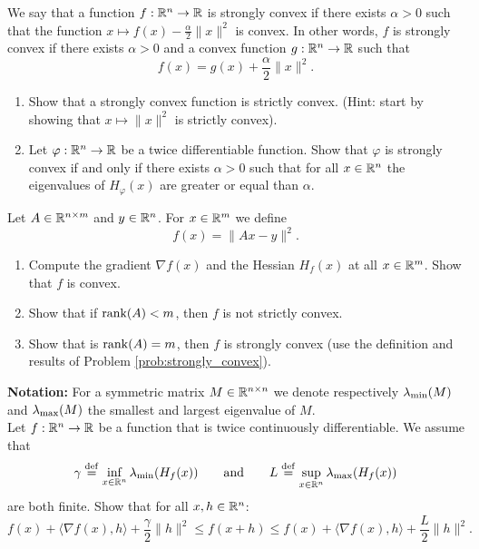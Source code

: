 \documentclass[11pt,nocut]{article}
\begin{document}
\begin{problem}[3 points]\label{prob:strongly_convex}
	We say that a function $f: \mathbb{R}^n \to \mathbb{R}$ is strongly convex if there exists $\alpha >0$ such that the function $x \mapsto f(x) - \frac{\alpha}{2} \|x\|^2$ is convex. In other words, $f$ is strongly convex if there exists $\alpha > 0$ and a convex function $g: \mathbb{R}^n \to \mathbb{R}$ such that 
	$$
	f(x) = g(x) + \frac{\alpha}{2} \|x\|^2.
	$$
	
	\begin{enumerate}[label=\normalfont(\textbf{\alph*})]
		\item Show that a strongly convex function is strictly convex. (Hint: start by showing that $x \mapsto \|x\|^2$ is strictly convex).
		\item Let $\varphi:\mathbb{R}^n \to \mathbb{R}$ be a twice differentiable function. Show that $\varphi$ is strongly convex if and only if there exists $\alpha >0$ such that for all $x \in \mathbb{R}^n$ the eigenvalues of $H_{\varphi}(x)$ are greater or equal than $\alpha$.
	\end{enumerate}
\end{problem}


\vspace{4mm}

\begin{problem}[3 points]
	Let $A \in \mathbb{R}^{n \times m}$ and $y \in \mathbb{R}^n$.
	For $x \in \mathbb{R}^m$ we define
	$$
	f(x) = \|Ax-y\|^2.
	$$
	\begin{enumerate}[label=\normalfont(\textbf{\alph*})]
		\item Compute the gradient $\nabla f(x)$ and the Hessian $H_f(x)$ at all $x \in \mathbb{R}^m$. Show that $f$ is convex.
		\item Show that if ${{\rm rank}}(A)<m$, then $f$ is not strictly convex.
		\item Show that is ${{\rm rank}}(A)=m$, then $f$ is strongly convex (use the definition and results of Problem \ref{prob:strongly_convex}).
	\end{enumerate}
\end{problem}

\vspace{4mm}

\begin{problem}[$\star$]
	\textbf{Notation:} For a symmetric matrix $M \in \mathbb{R}^{n \times n}$ we denote respectively $\lambda_{\rm min}(M)$ and $\lambda_{\rm max}(M)$ the smallest and largest eigenvalue of $M$.
	\\

	Let $f: \mathbb{R}^n \to \mathbb{R}$ be a function that is twice continuously differentiable. We assume that 
	$$
	\gamma \overset{\rm def}{=} \inf_{x \in \mathbb{R}^n} \lambda_{\rm min}(H_f(x))
	\qquad \text{and} \qquad
	L \overset{\rm def}{=} \sup_{x \in \mathbb{R}^n} \lambda_{\rm max}(H_f(x))
	$$
	are both finite. Show that for all $x,h \in \mathbb{R}^n$:
	$$
	f(x) + \langle \nabla f(x), h \rangle + \frac{\gamma}{2} \|h\|^2
	\leq f(x+h)
	\leq
	f(x) + \langle \nabla f(x), h \rangle + \frac{L}{2} \|h\|^2.
	$$

\end{problem}

\vspace{1cm}
\centerline{}

%
%
\end{document}
